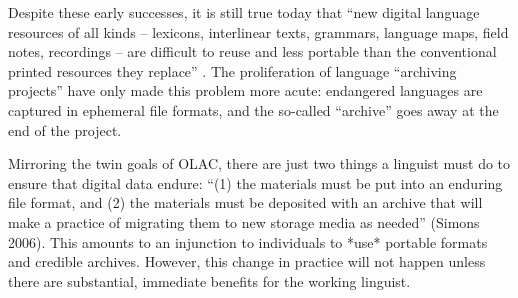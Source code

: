 Despite these early successes, it is still true today that ``new
digital language resources of all kinds -- lexicons, interlinear
texts, grammars, language maps, field notes, recordings -- are
difficult to reuse and less portable than the conventional printed
resources they replace'' \citep{BirdSimons03language}.  The proliferation of
language ``archiving projects'' have only made this problem more
acute: endangered languages are captured in ephemeral file formats,
and the so-called ``archive'' goes away at the end of the project.

Mirroring the twin goals of OLAC, there are just two things a linguist
must do to ensure that digital data endure: ``(1) the materials must be
put into an enduring file format, and (2) the materials must be
deposited with an archive that will make a practice of migrating them
to new storage media as needed'' (Simons 2006).  This amounts to an
injunction to individuals to *use* portable formats and credible
archives.  However, this change in practice will not happen unless
there are substantial, immediate benefits for the working linguist.

\vspace{1in}




\vspace{1in}

